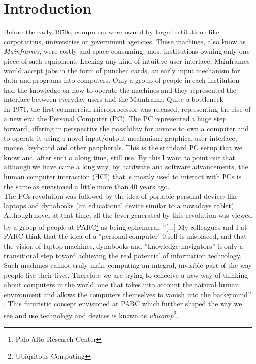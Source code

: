 \chapter{Introduction}\label{ch:introduction}

Before the early 1970s, computers were owned by large institutions like corporations, universities or government agencies. These machines, also know as \emph{Mainframes}, were costly and space consuming, most institutions owning only one piece of such equipment. Lacking any kind of intuitive user interface, Mainframes would accept jobs in the form of punched cards, an early input mechanism for data and programs into computers. Only a group of people in each institution had the knowledge on how to operate the machines and they represented the interface between everyday users and the Mainframe. Quite a bottleneck!\\

In 1971, the first commercial microprocessor was released, representing the rise of a new era: the Personal Computer (PC). The PC represented a huge step forward, offering in perspective the possibility for anyone to own a computer and to operate it using a novel input/output mechanism: graphical user interface, mouse, keyboard and other peripherals. This is the standard PC setup that we know and, after such o along time, still use. By this I want to point out that although we have came a long way, by hardware and software advancements, the human computer interaction (HCI) that is mostly used to interact with PCs is the same as envisioned a little more than 40 years ago.\\

The PCs revolution was followed by the idea of portable personal devices like laptops and dynabooks (an educational device similar to a nowadays tablet). Although novel at that time, all the fever generated by this revolution was viewed by a group of people at PARC\footnote{Palo Alto Research Center} as being ephemeral: ''[...] My colleagues and I at PARC think that the idea of a ''personal computer'' itself is misplaced, and that the vision of laptop machines, dynabooks and ''knowledge navigators'' is only a transitional step toward achieving the real potential of information technology. Such machines cannot truly make computing an integral, invisible part of the way people live their lives. Therefore we are trying to conceive a new way of thinking about computers in the world, one that takes into account the natural human environment and allows the computers themselves to vanish into the background''. \cite{weiser1991computer}. This futuristic concept envisioned at PARC which further shaped the way we see and use technology and devices is known as \emph{ubicomp}\footnote{Ubiquitous Computing}.\\

